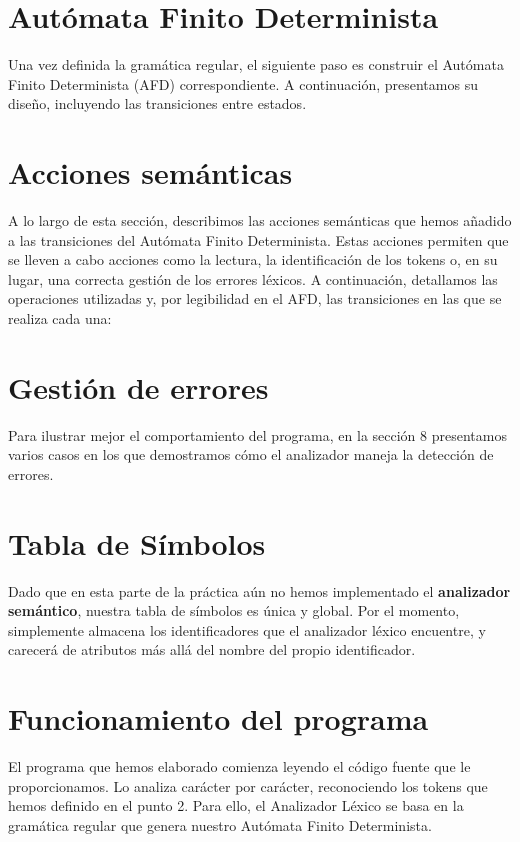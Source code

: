 \documentclass{article}
\begin{document}


\section{Autómata Finito Determinista}
Una vez definida la gramática regular, el siguiente paso es construir el Autómata Finito Determinista (AFD) correspondiente. A continuación, presentamos su diseño, incluyendo las transiciones entre estados.



\section{Acciones semánticas}
A lo largo de esta sección, describimos las acciones semánticas que hemos añadido a las transiciones del Autómata Finito Determinista. Estas acciones permiten que se lleven a cabo acciones como la lectura, la identificación de los tokens o, en su lugar, una correcta gestión de los errores léxicos. A continuación, detallamos las operaciones utilizadas y, por legibilidad en el AFD, las transiciones en las que se realiza cada una:\\


\section{Gestión de errores}


Para ilustrar mejor el comportamiento del programa, en la sección 8 presentamos varios casos en los que demostramos cómo el analizador maneja la detección de errores.

\section{Tabla de Símbolos}
Dado que en esta parte de la práctica aún no hemos implementado el \textbf{analizador semántico}, nuestra tabla de símbolos es única y global. Por el momento, simplemente almacena los identificadores que el analizador léxico encuentre, y carecerá de atributos más allá del nombre del propio identificador.

\section{Funcionamiento del programa}
El programa que hemos elaborado comienza leyendo el código fuente que le proporcionamos. Lo analiza carácter por carácter, reconociendo los tokens que hemos definido en el punto 2. Para ello, el Analizador Léxico se basa en la gramática regular que genera nuestro Autómata Finito Determinista.
\end{document}
